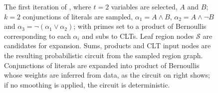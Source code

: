 \begin{figure}[t]
  \caption{The first iteration of , where $t=2$ variables are selected, $A$ and $B$;
    $k=2$ conjunctions of literals are sampled, $\alpha_1=A\wedge B$, $\alpha_2=A\wedge\neg B$ and
    $\alpha_3=\neg(\alpha_1\vee\alpha_2)$; with primes set to a product of Bernoullis corresponding
    to each $\alpha_i$ and subs to CLTs. Leaf region nodes $\mathcal{S}$ are candidates for
    expansion. Sums, products and CLT input nodes are the resulting probabilistic circuit from the
    sampled region graph. Conjunctions of literals are expanded into product of Bernoullis whose
    weights are inferred from data, as the circuit on right shows; if no smoothing is applied, the
    circuit is deterministic.}
  \label{fig:xpcs}
\end{figure}


